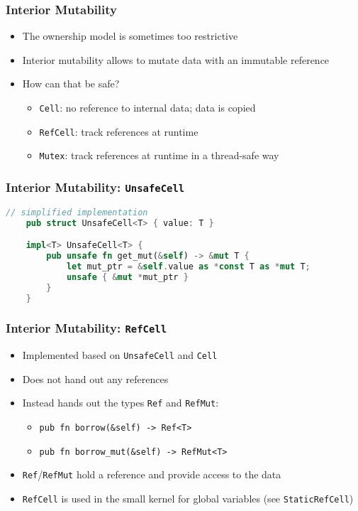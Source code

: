 \begin{frame}[fragile]
    \frametitle{Interior Mutability}

    \begin{itemize}
        \item The ownership model is sometimes too restrictive
        \item Interior mutability allows to mutate data with an immutable reference
        \pause
        \item How can that be safe?
        \begin{itemize}
            \item \texttt{Cell}: no reference to internal data; data is copied
            \item \texttt{RefCell}: track references at runtime
            \item \texttt{Mutex}: track references at runtime in a thread-safe way
        \end{itemize}
    \end{itemize}
\end{frame}

\begin{frame}[fragile]
    \frametitle{Interior Mutability: \texttt{UnsafeCell}}

    \begin{lstlisting}[language=rust]
    // simplified implementation
    pub struct UnsafeCell<T> { value: T }

    impl<T> UnsafeCell<T> {
        pub unsafe fn get_mut(&self) -> &mut T {
            let mut_ptr = &self.value as *const T as *mut T;
            unsafe { &mut *mut_ptr }
        }
    }
    \end{lstlisting}
\end{frame}

\begin{frame}[fragile]
    \frametitle{Interior Mutability: \texttt{RefCell}}

    \begin{itemize}
        \item Implemented based on \texttt{UnsafeCell} and \texttt{Cell}
        \item Does not hand out any references
        \item Instead hands out the types \texttt{Ref} and \texttt{RefMut}:
        \begin{itemize}
            \item \texttt{pub fn borrow(\&self) -> Ref<T>}
            \item \texttt{pub fn borrow\_mut(\&self) -> RefMut<T>}
        \end{itemize}
        \item \texttt{Ref}/\texttt{RefMut} hold a reference and provide access to the data
        \item \texttt{RefCell} is used in the small kernel for global variables (see \texttt{StaticRefCell})
    \end{itemize}
\end{frame}

